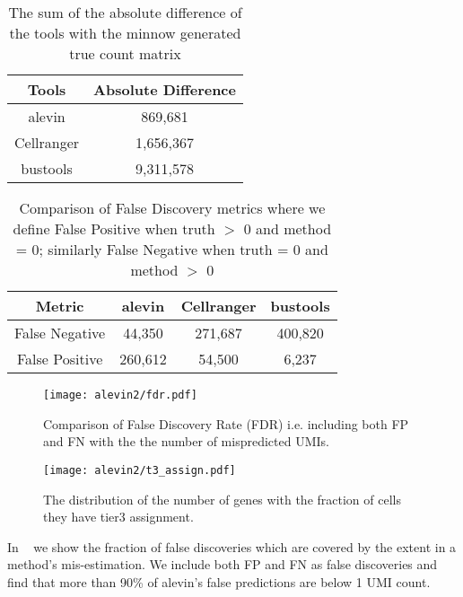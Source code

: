 \begin{table}[h!]
	\centering
	 \begin{tabular}{|| c | c||} 
		 \hline
		 Tools & Absolute Difference \\ [0.5ex] 
		 \hline\hline
		 alevin & 869,681 \\
		 \hline
		 Cellranger & 1,656,367 \\
		 \hline
		 bustools & 9,311,578 \\ [1ex] 
		 \hline
 	\end{tabular}
	\caption{The sum of the absolute difference of the tools with the minnow generated 
	true count matrix }
	\label{tab:matrix_diff}
\end{table}

\begin{table}[h!]
	\centering
	 \begin{tabular}{|| c | c | c | | c||} 
		 \hline
		 Metric & alevin & Cellranger & bustools \\ [0.5ex] 
		 \hline\hline
		 False Negative & 44,350 & 271,687 & 400,820 \\
		 \hline
		 False Positive & 260,612 & 54,500 & 6,237 \\ [1ex] 
		 \hline
 	\end{tabular}
	\caption{Comparison of False Discovery metrics where we define False Positive when truth 
	$>$ 0 and method = 0; similarly False Negative when truth = 0 and method $>$ 0}
	\label{tab:f1}
\end{table}

  \begin{figure}[!htb]
      \centering
    \texttt{[image: alevin2/fdr.pdf]}
    \caption{ Comparison of False Discovery Rate (FDR) i.e. including both FP and FN with the
	the number of mispredicted UMIs. }
    \label{fig:alv2_fdr}
  \end{figure}

  \begin{figure}[!htb]
      \centering
    \texttt{[image: alevin2/t3\_assign.pdf]}
    \caption{ The distribution of the number of genes with the fraction of cells they have tier3
	assignment.}
    \label{fig:alv2_t3}
  \end{figure}

In ~ we show the fraction of false discoveries which are covered by the
extent in a method's mis-estimation. We include both FP and FN as false discoveries and 
find that more than 90\% of alevin's false predictions are below 1 UMI count. 


